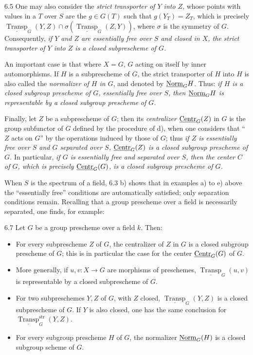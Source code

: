 \begin{examples}{6.5}
One may also consider the \emph{strict transporter of $Y$ into $Z$}, whose points with values in a $T$ over $S$ are the $g\in G(T)$ such that $g(Y_T)=Z_T$, which is precisely $\underline{\operatorname{Transp}}_G(Y,Z)\cap\sigma(\underline{\operatorname{Transp}}_G(Z,Y))$, where $\sigma$ is the symmetry of $G$. Consequently, \emph{if $Y$ and $Z$ are essentially free over $S$ and closed in $X$, the strict transporter of $Y$ into $Z$ is a closed subprescheme of $G$.}

An important case is that where $X=G$, $G$ acting on itself by inner automorphisms. If $H$ is a subprescheme of $G$, the strict transporter of $H$ into $H$ is also called the \emph{normalizer of $H$ in $G$}, and denoted by $\underline{\mathrm{Norm}}_G H$. Thus: \emph{if $H$ is a closed subgroup prescheme of $G$, essentially free over $S$, then $\underline{\mathrm{Norm}}_G H$ is representable by a closed subgroup prescheme of $G$.}

Finally, let $Z$ be a subprescheme of $G$; then its \emph{centralizer} $\underline{\mathrm{Centr}}_G(Z)$ in $G$ is the group subfunctor of $G$ defined by the procedure of d), when one considers that ``$Z$ acts on $G$'' by the operations induced by those of $G$; thus \emph{if $Z$ is essentially free over $S$ and $G$ separated over $S$, $\underline{\mathrm{Centr}}_G(Z)$ is a closed subgroup prescheme of $G$.} In particular, \emph{if $G$ is essentially free and separated over $S$, then the center $C$ of $G$, which is precisely $\underline{\mathrm{Centr}}_G(G)$, is a closed subgroup prescheme of $G$.}
\end{examples}
When $S$ is the spectrum of a field, 6.3 b) shows that in examples a) to e) above the ``essentially free'' conditions are automatically satisfied; only separation conditions remain. Recalling that a group prescheme over a field is necessarily separated, one finds, for example:
\begin{corollary}{6.7}\label{VIII.6.7}
 Let $G$ be a group prescheme over a field $k$. Then:
\begin{itemize}
\item For every subprescheme $Z$ of $G$, the centralizer of $Z$ in $G$ is a closed subgroup prescheme of $G$; this is in particular the case for the center $\underline{\mathrm{Centr}}_G(G)$ of $G$.
\item More generally, if $u,v:X\to G$ are morphisms of preschemes, $\underline{\operatorname{Transp}}_G(u,v)$ is representable by a closed subprescheme of $G$.
\item For two subpreschemes $Y,Z$ of $G$, with $Z$ closed, $\underline{\operatorname{Transp}}_G(Y,Z)$ is a closed subprescheme of $G$. If $Y$ is also closed, one has the same conclusion for $\underline{\operatorname{Transp}}^{\mathrm{str}}_G(Y,Z)$.
\item For every subgroup prescheme $H$ of $G$, the normalizer $\underline{\mathrm{Norm}}_G(H)$ is a closed subgroup scheme of $G$.
\end{itemize}
\end{corollary}
